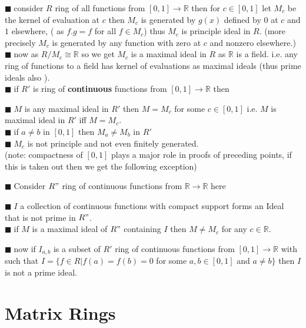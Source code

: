 \documentclass[11pt]{extarticle}
\newcommand{\ra}{\rightarrow}
\newcommand{\R}{\mathbb{R}}
\newcommand{\snote}[1]{{\footnotesize(#1)}}
\newcommand{\tbx}[2][]{
	\begin{tcolorbox}[enhanced,breakable,size=small,colback=black!2!white,title={#1},arc is angular, arc=1.5mm,drop fuzzy shadow]
		#2
	\end{tcolorbox}
}
\newcommand{\y}{$\blacksquare\;$}
\begin{document}
\begin{multicols}{2}
{		\y consider $ R $ ring of all functions from $ [0,1]\ra \R $ then for $ c\in [0,1] $  let $ M_c $ be the kernel of evaluation at $ c $ then $ M_c $ is generated by $ g(x) $ defined by $ 0 $ at $ c $ and $ 1 $ elsewhere, \snote{ as $ f.g=f $ for all $ f\in M_c $} thus $ M_c $ is principle ideal in $ R. $ \snote{more precisely $ M_c $ is generated by any function with zero at $ c $  and nonzero elsewhere.}\\
		\y now as $ R/M_c\cong \R $ so we get $ M_c $ is a maximal ideal in $ R $ as $ \R $ is a field. i.e. any ring of functions to a field has kernel of evaluations as maximal ideals \snote{thus prime ideals also	}.\\
		\y if $ R' $ is ring of \textbf{continuous} functions from $ [0,1]\ra \R $ then 
		\tbx{ \y $ M $ is any maximal ideal in $ R' $ then $ M=M_c $ for some $ c\in [0,1] $ i.e. $ M $ is maximal ideal in $ R' $ iff $ M=M_c $.\\
		\y if $ a\neq b  $ in $ [0,1] $ then $ M_a\neq M_b $ in $ R' $ \\
		\y $ M_c $ is not principle and not even finitely generated.\\
		\snote{note: compactness of $ [0,1] $ plays a major role in proofs of preceding points, if this is taken out then we get the following exception}}
		\y Consider $ R" $ ring of continuous functions from $ \R\ra \R $ here 
		\tbx{ \y $ I $ a collection of continuous functions with compact support forms an Ideal that is not prime in $ R" $. \\
		\y if $ M $ is a maximal ideal of $ R" $ containing  $ I $  then $ M\neq M_c $ for any $ c\in \R $.}
		\y now if $ I_{a,b} $ is a subset of $ R' $ ring of continuous functions from $ [0,1]\ra \R $ with such that $ I=\{f\in R|f(a)=f(b)=0 $ for some $ a,b\in [0,1] $ and $ a\neq b \}$ then $ I $ is not a prime ideal. }
		
\section{Matrix Rings}


\end{multicols}
\end{document}
